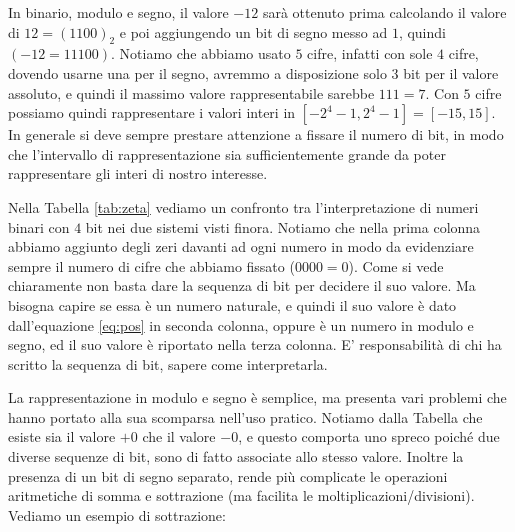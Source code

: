 \begin{ex} In binario, modulo e segno, il valore $-12$ sarà ottenuto prima
calcolando il valore di $12 = (1100)_2$ e poi aggiungendo un bit di segno messo
ad $1$, quindi $(-12 = 11100)$. Notiamo che abbiamo usato $5$ cifre, infatti
con sole $4$ cifre, dovendo usarne una per il segno, avremmo a disposizione
solo $3$ bit per il valore assoluto, e quindi il massimo valore rappresentabile
sarebbe $111 = 7$. Con $5$ cifre possiamo quindi rappresentare i valori interi
in $[-2^4-1,2^4-1] = [-15,15]$. In generale si deve sempre prestare attenzione a fissare il numero di bit, in modo che l'intervallo di rappresentazione sia sufficientemente grande da poter rappresentare gli interi di nostro interesse.
\end{ex}




Nella Tabella \ref{tab:zeta} vediamo un confronto tra l'interpretazione di numeri binari con $4$ bit nei due sistemi visti finora. Notiamo che nella prima
colonna abbiamo aggiunto degli zeri davanti ad ogni numero in modo da
evidenziare sempre il numero di cifre che abbiamo fissato ($0000 = 0$). Come si
vede chiaramente non basta dare la sequenza di bit per decidere il suo valore.
Ma bisogna capire se essa è un numero naturale, e quindi il suo valore è dato
dall'equazione \eqref{eq:pos} in seconda colonna, oppure è un numero in modulo e
segno, ed il suo valore è riportato nella terza colonna. E' responsabilità di
chi ha scritto la sequenza di bit, sapere come interpretarla.

La rappresentazione in modulo e segno è semplice, ma presenta vari problemi che
hanno portato alla sua scomparsa nell'uso pratico. Notiamo dalla Tabella che
esiste sia il valore $+0$ che il valore $-0$, e questo comporta uno spreco
poiché due diverse sequenze di bit, sono di fatto associate allo stesso valore.
Inoltre la presenza di un bit di segno separato, rende più complicate le
operazioni aritmetiche di somma e sottrazione (ma facilita le
moltiplicazioni/divisioni). Vediamo un esempio di sottrazione:

